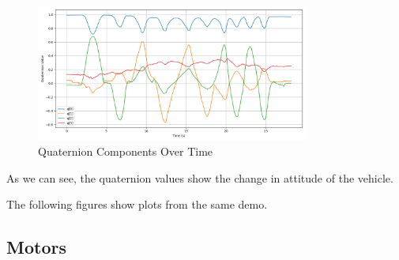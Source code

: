 \documentclass[a4paper]{article}
\begin{document}
\begin{figure}[H]
    \centering
    \includegraphics[width=0.8\textwidth]{imgs/demo_data/quaternion.png}
    \caption{Quaternion Components Over Time}
    \label{fig:demo_quaternion}
\end{figure}

As we can see, the quaternion values show the change in attitude of the vehicle. 

The following figures show plots from the same demo. 

\subsection{Motors}
\end{document}

